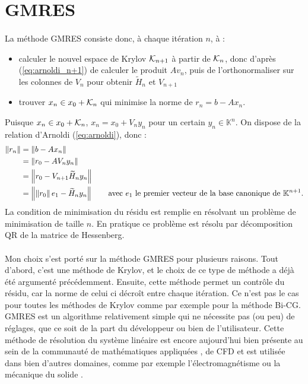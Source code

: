 \section{GMRES}

	\paragraph{}
	La méthode GMRES consiste donc, à chaque itération $n$, à :
	\begin{itemize}
		\item calculer le nouvel espace de Krylov $\krylov{n+1}$ à partir de $\krylov{n}$, donc d'après (\ref{eq:arnoldi_n+1}) de calculer le produit $Av_n$, puis de l'orthonormaliser sur les colonnes de $V_n$ pour obtenir $\widetilde{H}_n$ et $V_{n+1}$
		\item trouver $x_n \in x_0 + \krylov{n}$ qui minimise la norme de $r_n = b - Ax_n$.
	\end{itemize}
	Puisque $x_n \in x_0 + \krylov{n}$, $x_n = x_0 + V_n y_n$ pour un certain $y_n\in\mathbb{K}^n$.
	On dispose de la relation d'Arnoldi (\ref{eq:arnoldi}), donc :
	\begin{align*}
		\norm{r_n} &= \norm{b - Ax_n} \\
		&= \norm{r_0 - AV_ny_n} \\
		&= \norm{r_0 - V_{n+1}\widetilde{H}_ny_n} \\
		&= \norm{\norm{r_0} e_1 - \widetilde{H}_ny_n}\qquad\textrm{avec $e_1$ le premier vecteur de la base canonique de $\mathbb{K}^{n+1}$.}
	\end{align*}
	La condition de minimisation du résidu est remplie en résolvant un problème de minimisation de taille $n$.
	En pratique ce problème est résolu par décomposition QR de la matrice de Hessenberg.

	\paragraph{}
	Mon choix s'est porté sur la méthode GMRES pour plusieurs raisons.
	Tout d'abord, c'est une méthode de Krylov, et le choix de ce type de méthode a déjà été argumenté précédemment.
	Ensuite, cette méthode permet un contrôle du résidu, car la norme de celui ci décroît entre chaque itération.
	Ce n'est pas le cas pour toutes les méthodes de Krylov comme par exemple pour la méthode Bi-CG.
	GMRES est un algorithme relativement simple qui ne nécessite pas (ou peu) de réglages, que ce soit de la part du développeur ou bien de l'utilisateur.
	Cette méthode de résolution du système linéaire est encore aujourd'hui bien présente au sein de la communauté de mathématiques appliquées \cite{Vasseur2016}, de CFD \cite{FrancoCamierAndrejEtAl2020} et est utilisée dans bien d'autres domaines, comme par exemple l'électromagnétisme \cite{ErnstGander2012} ou la mécanique du solide \cite{Mercier2015}.
